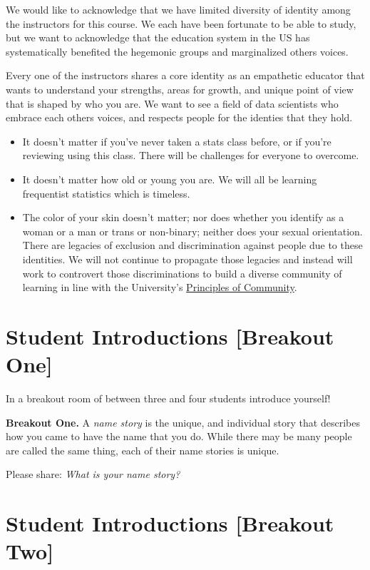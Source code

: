 \documentclass[
]{book}
\providecommand{\tightlist}{%
  \setlength{\itemsep}{0pt}\setlength{\parskip}{0pt}}
\theoremstyle{definition}
\theoremstyle{definition}
\theoremstyle{definition}
\theoremstyle{definition}
\theoremstyle{remark}
\begin{document}
We would like to acknowledge that we have limited diversity of identity among the instructors for this course. We each have been fortunate to be able to study, but we want to acknowledge that the education system in the US has systematically benefited the hegemonic groups and marginalized others voices.

Every one of the instructors shares a core identity as an empathetic educator that wants to understand your strengths, areas for growth, and unique point of view that is shaped by who you are. We want to see a field of data scientists who embrace each others voices, and respects people for the identies that they hold.

\begin{itemize}
\tightlist
\item
  It doesn't matter if you've never taken a stats class before, or if you're reviewing using this class. There will be challenges for everyone to overcome.
\item
  It doesn't matter how old or young you are. We will all be learning frequentist statistics which is timeless.
\item
  The color of your skin doesn't matter; nor does whether you identify as a woman or a man or trans or non-binary; neither does your sexual orientation. There are legacies of exclusion and discrimination against people due to these identities. We will not continue to propagate those legacies and instead will work to controvert those discriminations to build a diverse community of learning in line with the University's \href{https://diversity.berkeley.edu/principles-community}{Principles of Community}.
\end{itemize}

\section{Student Introductions {[}Breakout One{]}}\label{student-introductions-breakout-one}

In a breakout room of between three and four students introduce yourself!

\textbf{Breakout One.} A \emph{name story} is the unique, and individual story that describes how you came to have the name that you do. While there may be many people are called the same thing, each of their name stories is unique.

Please share: \emph{What is your name story?}

\section{Student Introductions {[}Breakout Two{]}}\label{student-introductions-breakout-two}
\end{document}
